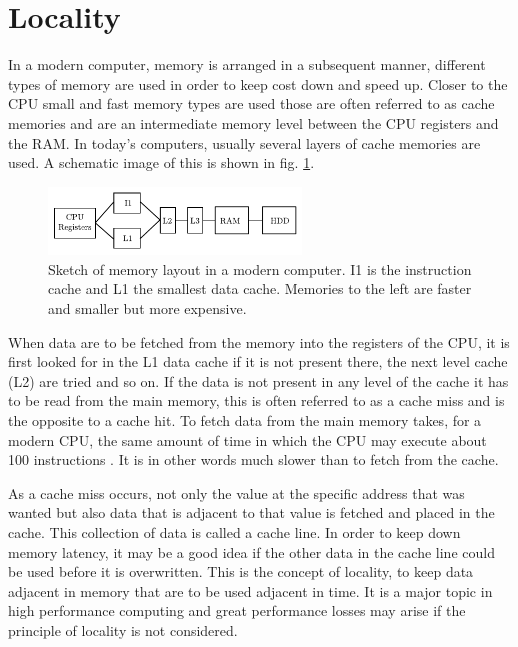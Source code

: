 \section{Locality}
In a modern computer, memory is arranged in a subsequent manner,
different types of memory are used in order to keep cost down and
speed up. Closer to the CPU small and fast memory types are used those
are often referred to as cache memories and are an intermediate memory
level between the CPU registers and the RAM. In today's computers,
usually several layers of cache memories are used. A schematic image
of this is shown in fig. \ref{fig:hpc:mem}.

\begin{figure}
\begin{center}
\includegraphics[width=0.6\textwidth]{fig/mem.pdf}
\end{center}
\caption[Sketch of memory layout in a modern computer.]{Sketch of
  memory layout in a modern computer. I1 is the instruction cache and
  L1 the smallest data cache. Memories to the left are faster and
  smaller but more expensive. }
\label{fig:hpc:mem}
\end{figure}

When data are to be fetched from the memory into the registers of the
CPU, it is first looked for in the L1 data cache if it is not present
there, the next level cache (L2) are tried and so on. If the data is
not present in any level of the cache it has to be read from the main
memory, this is often referred to as a cache miss and is the opposite
to a cache hit. To fetch data from the main memory takes, for a modern
CPU, the same amount of time in which the CPU may execute about 100
instructions \cite{wiki-mem}. It is in other words much slower than to
fetch from the cache.

As a cache miss occurs, not only the value at the specific address
that was wanted but also data that is adjacent to that value is
fetched and placed in the cache. This collection of data is called a
cache line. In order to keep down memory latency, it may be a good
idea if the other data in the cache line could be used before it is
overwritten. This is the concept of locality, to keep data adjacent in
memory that are to be used adjacent in time. It is a major topic in
high performance computing and great performance losses may arise if
the principle of locality is not considered.


